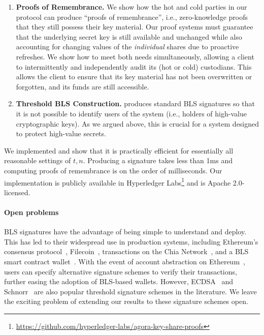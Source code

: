 \begin{enumerate}
    \item \textbf{Proofs of Remembrance.}
    We show how the hot and cold parties in our protocol can produce ``proofs of remembrance'', i.e., zero-knowledge proofs that they still possess their key material. Our proof systems must guarantee that the underlying secret key is still available and unchanged while also accounting for changing values of the \emph{individual} shares due to proactive refreshes. We show how to meet both needs simultaneously, allowing a client to intermittently and independently audit its (hot or cold) custodians. This allows the client to ensure that its key material has not been overwritten or forgotten, and its funds are still accessible.

    \item \textbf{Threshold BLS Construction.} \sysname produces standard BLS signatures so that it is not possible to identify users of the system (i.e., holders of high-value cryptographic keys). As we argued above, this is crucial for a system designed to protect high-value secrets.
\end{enumerate}

We implemented \sysname and show that it is practically efficient for essentially all reasonable settings of $t, n$. Producing a signature takes less than 1ms and computing proofs of remembrance is on the order of milliseconds. Our implementation is publicly available in Hyperledger Labs\footnote{\url{https://github.com/hyperledger-labs/agora-key-share-proofs}} and is Apache 2.0-licensed. 

\paragraph{Open problems} BLS signatures have the advantage of being simple to understand and deploy. This has led to their widespread use in production systems, including Ethereum's consensus protocol~\cite[\S2.9.1]{eth2book}, Filecoin~\cite{filecoin-spec}, transactions on the Chia Network~\cite{chia-bls}, and a BLS smart contract wallet~\cite{bls-wallet}. With the event of account abstraction on Ethereum~\cite{account-abstraction}, users can specify alternative signature schemes to verify their transactions, further easing the adoption of BLS-based wallets.  However,  ECDSA~\cite{EPRINT:GenGolNar16,SP:DKLs18,CCS:LinNof18,CCS:GenGol18,EPRINT:AumHamShl20,EPRINT:GKSS20,EPRINT:DJNPO20,CCS:CGGMP20,PKC:CCLST20,EPRINT:CCLST21,CANS:Pettit21,SP:ANOSS22} and Schnorr~\cite{SAC:KomGol20,C:BCKMTZ22,EPRINT:BatLonMen22} are also popular threshold signature schemes in the literature. We leave the exciting problem of extending our results to these signature schemes open. 
